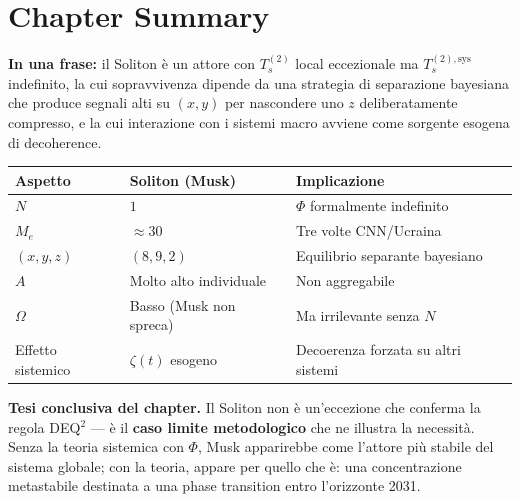 \section{Chapter Summary}\label{sintesi-del-chapter}

\Proved{} \textbf{In una frase:} il Soliton è un attore con
\(T_s^{(2)}\) local eccezionale ma \(T_s^{(2),\text{sys}}\) indefinito,
la cui sopravvivenza dipende da una strategia di separazione bayesiana
che produce segnali alti su \((x, y)\) per nascondere uno \(z\)
deliberatamente compresso, e la cui interazione con i sistemi macro
avviene come sorgente esogena di decoherence.

{\def\LTcaptype{none} %
{\small\begin{longtable}[]{@{}
  >{\raggedright\arraybackslash}p{}
  >{\raggedright\arraybackslash}p{}
  >{\raggedright\arraybackslash}p{}@{}}
\toprule\noalign{}
\begin{minipage}[b]{\linewidth}\raggedright
Aspetto
\end{minipage} & \begin{minipage}[b]{\linewidth}\raggedright
Soliton (Musk)
\end{minipage} & \begin{minipage}[b]{\linewidth}\raggedright
Implicazione
\end{minipage} \\
\midrule\noalign{}
\endhead
\bottomrule\noalign{}
\endlastfoot
\(N\) & \(1\) & \(\Phi\) formalmente indefinito \\
\(M_e\) & \(\approx 30\) & Tre volte CNN/Ucraina \\
\((x, y, z)\) & \((8, 9, 2)\) & Equilibrio separante bayesiano \\
\(A\) & Molto alto individuale & Non aggregabile \\
\(\Omega\) & Basso (Musk non spreca) & Ma irrilevante senza \(N\) \\
Effetto sistemico & \(\zeta(t)\) esogeno & Decoerenza forzata su altri
sistemi \\
\end{longtable}}
}

\Hypoth{} \textbf{Tesi conclusiva del chapter.} Il Soliton non è
un'eccezione che conferma la regola DEQ$^2$ --- è il \textbf{caso limite
metodologico} che ne illustra la necessità. Senza la teoria sistemica
con \(\Phi\), Musk apparirebbe come l'attore più stabile del sistema
globale; con la teoria, appare per quello che è: una concentrazione
metastabile destinata a una phase transition entro l'orizzonte 2031.



